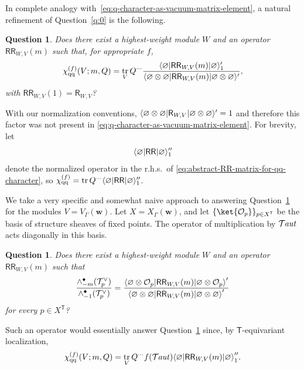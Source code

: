 \documentclass[10pt,a4paper]{amsart}
\numberwithin{equation}{section}
\newtheorem{question}[Theorem]{Question}
\renewcommand{\vec}[1]{\bm{#1}}
\newcommand{\cO}{\mathcal{O}}
\newcommand{\cT}{\mathcal{T}}
\newcommand{\kQ}{Q}
\newcommand{\sT}{\mathsf{T}}
\newcommand{\sR}{\mathsf{R}}
\newcommand{\sRR}{\mathsf{RR}}
\newcommand{\chiqq}{\chi_{\mathrm{qq}}}
\DeclareMathOperator{\Taut}{\mathcal{T}\mkern-1.5mu{\mathit{aut}}}
\DeclareMathOperator{\tr}{tr}
\DeclarePairedDelimiter{\inner}{\langle}{\rangle}
\begin{document}
\begin{MyParagraph}
In complete analogy with~\eqref{eq:q-character-as-vacuum-matrix-element}, a natural refinement
of Question~\ref{q:0} is the following.

\begin{question}\label{q:1}
 Does there exist a highest-weight module $W$ and an operator
 $\sRR_{W,V}(m)$ such that, for appropriate $f$,
 \begin{equation} \label{eq:abstract-RR-matrix-for-qq-character}
 \chiqq^{(f)}(V; m, \kQ) = \tr_V \kQ^{\cdots} \frac{\inner{\varnothing | \sRR_{W,V}(m) | \varnothing}_1'}{\inner{\varnothing \otimes \varnothing | \sRR_{W,V}(m) | \varnothing \otimes \varnothing}'},
 \end{equation}
 with $\sRR_{W,V}(1) = \sR_{W,V}$?
\end{question}

With our normalization conventions,
$\inner{\varnothing \otimes \varnothing | \sR_{W,V} | \varnothing \otimes \varnothing}' = 1$
and therefore this factor was not present in
\eqref{eq:q-character-as-vacuum-matrix-element}. For brevity, let
\[ \inner{\varnothing | \sRR | \varnothing}_1'' \]
denote the normalized operator in the r.h.s.\ of
\eqref{eq:abstract-RR-matrix-for-qq-character}, so
$\chiqq^{(f)} = \tr \kQ^{\cdots} \inner{\varnothing | \sRR | \varnothing}_1''$.
\end{MyParagraph}

\begin{MyParagraph}
We take a very specific and somewhat naive approach to answering
Question~\ref{q:1} for the modules $V = V_\Gamma(\vec w)$. Let
$X = X_\Gamma(\vec w)$, and let $\{\ket{\cO_p}\}_{p \in X^\sT}$ be the
basis of structure sheaves of fixed points. The operator of
multiplication by $\Taut$ acts diagonally in this basis.

\begin{question}\label{q:2}
 Does there exist a highest-weight module $W$ and an operator
 $\sRR_{W,V}(m)$ such that
 \[ \frac{\wedge_{-m}^\bullet(\cT_p^\vee)}{\wedge_{-1}^\bullet(\cT_p^\vee)} = \frac{\inner*{\varnothing \otimes \cO_p | \sRR_{W,V}(m) | \varnothing \otimes \cO_p}'}{\inner*{\varnothing \otimes \varnothing | \sRR_{W,V}(m) | \varnothing \otimes \varnothing}'} \]
 for every $p \in X^{\sT}$?
\end{question}

Such an operator would essentially answer Question~\ref{q:1} since, by
$\sT$-equivariant localization,
\begin{equation} \label{eq:qq-character-in-fixed-point-basis}
 \chiqq^{(f)}(V; m, \kQ) = \tr_V \kQ^{\cdots} f(\Taut) \inner*{\varnothing | \sRR_{W,V}(m) | \varnothing}_1''.
\end{equation}
\end{MyParagraph}
\end{document}
